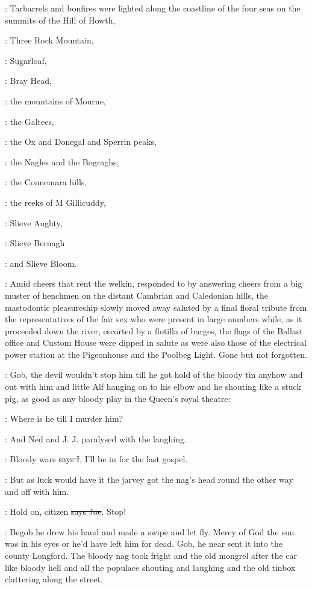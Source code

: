 :
Tarbarrels and bonfires were lighted along the coastline
of the four seas on the summits of
the Hill of Howth,

:
Three Rock Mountain,

:
Sugarloaf,

:
Bray Head,

:
the mountains of Mourne,

:
the Galtees,

:
the Ox and Donegal and Sperrin peaks,

:
the Nagles and the Bograghs,

:
the Connemara hills,

:
the reeks of M Gillicuddy,

:
Slieve Aughty,

:
Slieve Bernagh

:
and Slieve Bloom.

:
Amid cheers that rent the welkin, responded to by answering cheers from a big
muster of henchmen on the distant Cambrian and Caledonian hills, the
mastodontic pleasureship slowly moved away saluted by a final floral
tribute from the representatives of the fair sex who were present in large
numbers while, as it proceeded down the river, escorted by a flotilla of
barges, the flags of the Ballast office and Custom House were dipped in
salute as were also those of the electrical power station at the
Pigeonhouse and the Poolbeg Light.
 Gone but not forgotten.

\Nq:
Gob, the devil wouldn't stop him till he got hold of the bloody tin
anyhow and out with him and little Alf hanging on to his elbow and he
shouting like a stuck pig, as good as any bloody play in the Queen's royal
theatre:

\citizen:
Where is he till I murder him?

\Nq:
And Ned and J. J. paralysed with the laughing.

:
Bloody wars \sout{says I},
I'll be in for the last gospel.

\Nq:
But as luck would have it
the jarvey got the nag's head round the
other way and off with him.

\joe:
Hold on, citizen \sout{says Joe}. Stop!

\Nq:
Begob he drew his hand and made a swipe and let fly. Mercy of God the sun
was in his eyes or he'd have left him for dead. Gob, he near sent it
into the county Longford. The bloody nag took fright and the old mongrel
after the car like bloody hell and all the populace shouting and laughing
and the old tinbox clattering along the street.

